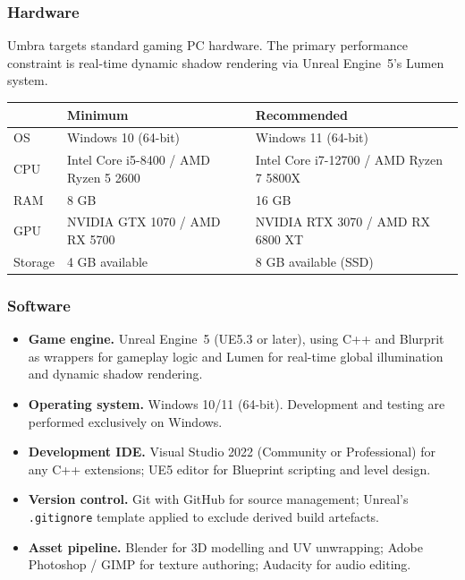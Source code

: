 \documentclass[11pt, letterpaper]{article}
\begin{document}
        \subsubsection{Hardware}
        Umbra targets standard gaming PC hardware. The primary performance constraint
        is real-time dynamic shadow rendering via Unreal Engine~5's Lumen system.

        \begin{center}
        \begin{tabularx}{\linewidth}{lXX}
            \toprule
            & \textbf{Minimum} & \textbf{Recommended} \\
            \midrule
            OS      & Windows 10 (64-bit)            & Windows 11 (64-bit) \\
            CPU     & Intel Core i5-8400 / AMD Ryzen 5 2600
                    & Intel Core i7-12700 / AMD Ryzen 7 5800X \\
            RAM     & 8 GB                           & 16 GB \\
            GPU     & NVIDIA GTX 1070 / AMD RX 5700  & NVIDIA RTX 3070 / AMD RX 6800 XT \\
            Storage & 4 GB available                 & 8 GB available (SSD) \\
            \bottomrule
        \end{tabularx}
        \end{center}

        \subsubsection{Software}
        \begin{itemize}[leftmargin=1.5em, itemsep=2pt]
            \item \textbf{Game engine.} Unreal Engine~5 (UE5.3 or later), using
                  C++ and Blurprit as wrappers for gameplay logic and Lumen for real-time global
                  illumination and dynamic shadow rendering.
            \item \textbf{Operating system.} Windows 10/11 (64-bit). Development
                  and testing are performed exclusively on Windows.
            \item \textbf{Development IDE.} Visual Studio 2022 (Community or
                  Professional) for any C++ extensions; UE5 editor for Blueprint
                  scripting and level design.
            \item \textbf{Version control.} Git with GitHub for source management;
                  Unreal's \texttt{.gitignore} template applied to exclude derived
                  build artefacts.
            \item \textbf{Asset pipeline.} Blender for 3D modelling and UV unwrapping;
                  Adobe Photoshop / GIMP for texture authoring; Audacity for audio
                  editing.
        \end{itemize}
\end{document}
